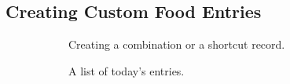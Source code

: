 \subsection{Creating Custom Food Entries}
\begin{figure}	
\centering
\begin{subfigure}[t]{1.25in}
		\centering
		\setlength\fboxsep{0pt}
\setlength\fboxrule{0.5pt}
		\caption{Creating a combination or a shortcut record.}\label{fig:pond_combo}
	\end{subfigure}
\quad
\begin{subfigure}[t]{1.25in}
		\centering
		\setlength\fboxsep{0pt}
\setlength\fboxrule{0.5pt}
		\caption{A list of today's entries. }\label{fig:pond_details_c}
	\end{subfigure}
\quad
\begin{subfigure}[t]{1.25in}
		\centering
		\setlength\fboxsep{0pt}
\setlength\fboxrule{0.5pt}

\end{subfigure}
\end{figure}
